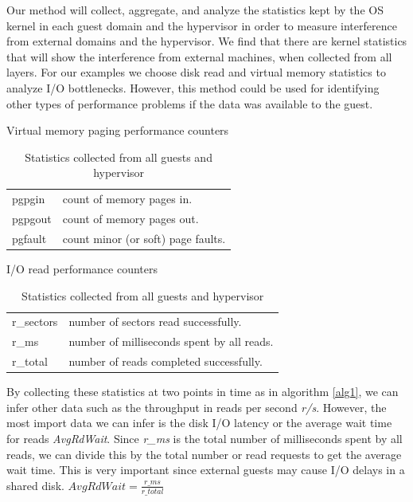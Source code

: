 Our method will collect, aggregate, and analyze the statistics kept by the OS kernel in each guest domain and the hypervisor in order to measure interference from external domains and the hypervisor.  We find that there are kernel statistics that will show the interference from external machines, when collected from all layers.  For our examples we choose disk read and virtual memory statistics to analyze I/O bottlenecks.  However, this method could be used for identifying other types of performance problems if the data was available to the guest.

\begin{table}[h]
\begin{subtable}[h]{0.45\textwidth}
\caption{Virtual memory paging performance counters \cite{memory}}
\begin{tabular}{ l l }
       pgpgin  &  count of memory pages in. \\
       pgpgout  & count of memory pages out. \\
       pgfault  & count minor (or soft) page faults. \\
\end{tabular}
\label{fig:memory}
\end{subtable}
\hfill
\begin{subtable}[h]{0.45\textwidth}
\caption{I/O read performance counters \cite{iostats}}
\begin{tabular}{ l l }
       r\_sectors & number of sectors read successfully. \\
       r\_ms & number of milliseconds spent by all reads. \\
       r\_total & number of reads completed successfully. \\
\end{tabular}
\label{fig:io}
\end{subtable}
\caption{Statistics collected from all guests and hypervisor}
\end{table}

By collecting these statistics at two points in time as in algorithm \ref{alg1}, we can infer other data such as the throughput in reads per second \emph{r/s}.  However, the most import data we can infer is the disk I/O latency or the average wait time for reads \emph{AvgRdWait}.  
Since \emph{r\_ms} is the total number of milliseconds spent by all reads, we can divide this by the total number or read requests to get the average wait time.  This is very important since external guests may cause I/O delays in a shared disk.
\newline\newline
	$AvgRdWait = \frac{r\_ms}{r\_total}$ \\

